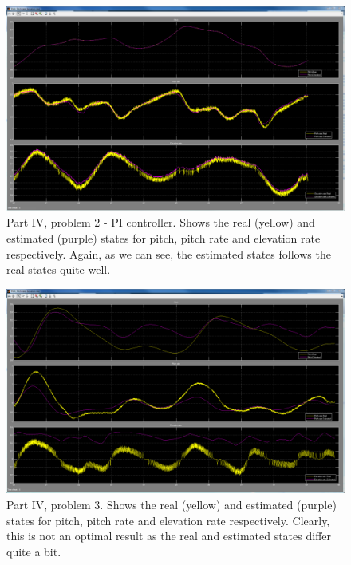 \begin{figure}[htb]
	\centering
		\includegraphics[width=1\textwidth]{figures/superplots_P4p2_del2_integrate_best.PNG}
	\caption{Part IV, problem 2 - PI controller. Shows the real (yellow) and estimated (purple) states for pitch, pitch rate and elevation rate respectively. Again, as we can see, the estimated states follows the real states quite well.}
\label{fig:P4p2_int_states_vs_obs}
\end{figure}
\begin{figure}[htb]
	\centering
		\includegraphics[width=1\textwidth]{figures/superplots_P4p3.PNG}
	\caption{Part IV, problem 3. Shows the real (yellow) and estimated (purple) states for pitch, pitch rate and elevation rate respectively. Clearly, this is not an optimal result as the real and estimated states differ quite a bit.}
\label{fig:P4p3}
\end{figure}
